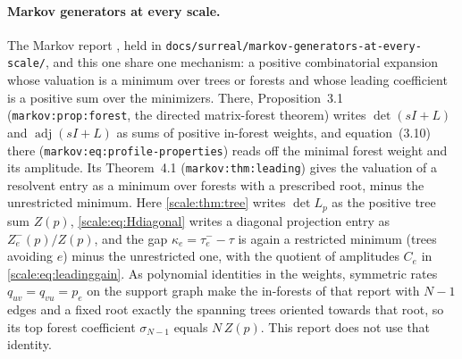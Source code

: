 \documentclass[11pt,a4paper]{article}
\numberwithin{equation}{section}
\theoremstyle{definition}
\begin{document}
\paragraph{Markov generators at every scale.}
The Markov report \cite{RepoMarkov}, held in
\nolinkurl{docs/surreal/markov-generators-at-every-scale/}, and this one
share one mechanism: a positive combinatorial
expansion whose valuation is a minimum over trees or forests and whose
leading coefficient is a positive sum over the minimizers. There,
Proposition~3.1 (\nolinkurl{markov:prop:forest}, the directed matrix-forest
theorem) writes $\det(sI+L)$ and $\operatorname{adj}(sI+L)$ as sums of
positive in-forest weights, and equation~(3.10) there
(\nolinkurl{markov:eq:profile-properties}) reads off the minimal forest weight
and its amplitude. Its Theorem~4.1 (\nolinkurl{markov:thm:leading}) gives the
valuation of a resolvent entry as a minimum over forests with a prescribed
root, minus the unrestricted minimum. Here \cref{scale:thm:tree} writes
$\det L_p$ as the positive tree sum $Z(p)$, \eqref{scale:eq:Hdiagonal} writes
a diagonal projection entry as $Z_e^-(p)/Z(p)$, and the gap
$\kappa_e=\tau_e^--\tau$ is again a restricted minimum (trees avoiding $e$)
minus the unrestricted one, with the quotient of amplitudes
$C_e$ in \eqref{scale:eq:leadinggain}. As polynomial identities in the
weights, symmetric rates $q_{uv}=q_{vu}=p_e$ on the support graph make the
in-forests of that report with $N-1$ edges and a fixed root exactly the
spanning trees oriented towards that root, so its top forest coefficient
$\sigma_{N-1}$ equals $N\,Z(p)$. This report does not use that identity.
\end{document}
